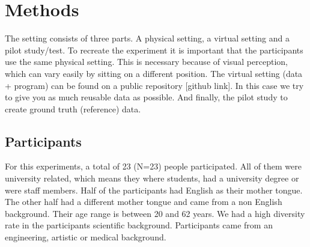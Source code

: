 \documentclass{acm_proc_article-sp}
\begin{document}







\section{Methods}
The setting consists of three parts. A physical setting, a virtual setting and a pilot study/test. To recreate the experiment it is important that the participants use the same physical setting. This is necessary because of visual perception, which can vary easily by sitting on a different position. The virtual setting (data + program) can be found on a public repository [github link]. In this case we try to give you as much reusable data as possible. And finally, the pilot study to create ground truth (reference) data.


\subsection{Participants}
For this experiments, a total of 23 (N=23) people participated. All of them were university related, which means they where students, had a university degree or were staff members. Half of the participants had English as their mother tongue. The other half had a different mother tongue and came from a non English background. Their age range is between 20 and 62 years. We had a high diversity rate in the participants scientific background. Participants came from an engineering, artistic or medical background.  
\end{document}
